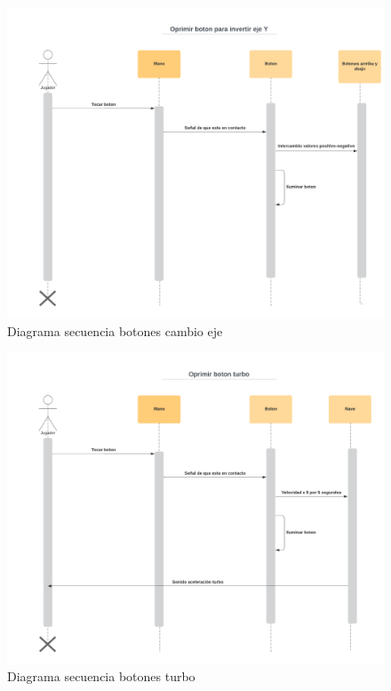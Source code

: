 \documentclass[12pt]{article} %
\begin{document}
\begin{figure}  [!htb]
  \includegraphics[width=\linewidth]{Diagrama secuencia oprimir boton eje y.png}
  \caption{Diagrama secuencia botones cambio eje}
\end{figure}

\begin{figure}  [!htb]
  \includegraphics[width=\linewidth]{Diagrama secuencia oprimir boton turbo.png}
  \caption{Diagrama secuencia botones turbo}
\end{figure}
\end{document}
